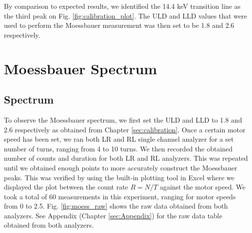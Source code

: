 \documentclass[a4paper]{report}
\numberwithin{equation}{section}
\begin{document}
By comparison to expected results, we identified the 14.4 keV transition line as the third peak on Fig. \ref{fig:calibration_plot}. 
The ULD and LLD values that were used to perform the Moessbauer measurement was then set to be 1.8 and 2.6 respectively. \par 



\chapter{Moessbauer Spectrum}

\section{Spectrum}

To observe the Moessbauer spectrum, we first set the ULD and LLD to 1.8 and 2.6 respectively as obtained from Chapter \ref{sec:calibration}. 
Once a certain motor speed has been set, we ran both LR and RL single channel analyzer for a set number of turns, ranging from 4 to 10
turns. We then recorded the obtained number of counts and duration for both LR and RL analyzers. This was repeated until we obtained 
enough points to more accurately construct the Moessbauer peaks. This was verified by using the built-in plotting tool in Excel where we 
displayed the plot between the count rate $R = N / T$ against the motor speed. We took a total of 60 measurements in this experiment, ranging for 
motor speeds from 0 to 2.5. Fig. \ref{fig:moess_raw} shows the raw data obtained from both analyzers. See Appendix (Chapter \ref{sec:Appendix}) for the raw data table obtained from both analyzers. \par 
\end{document}
